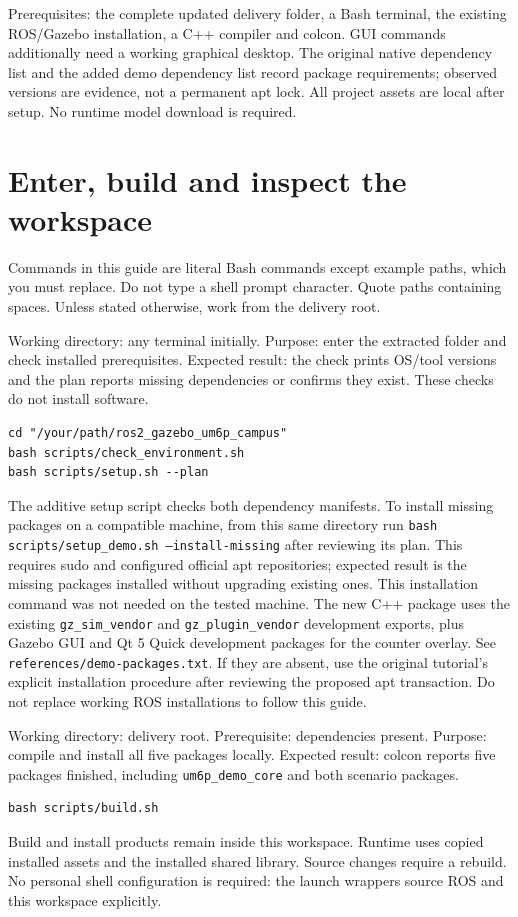 Prerequisites: the complete updated delivery folder, a Bash terminal, the existing ROS/Gazebo installation, a C++ compiler and colcon. GUI commands additionally need a working graphical desktop. The original native dependency list and the added demo dependency list record package requirements; observed versions are evidence, not a permanent apt lock. All project assets are local after setup. No runtime model download is required.

\section{Enter, build and inspect the workspace}
Commands in this guide are literal Bash commands except example paths, which you must replace. Do not type a shell prompt character. Quote paths containing spaces. Unless stated otherwise, work from the delivery root.

Working directory: any terminal initially. Purpose: enter the extracted folder and check installed prerequisites. Expected result: the check prints OS/tool versions and the plan reports missing dependencies or confirms they exist. These checks do not install software.
\begin{lstlisting}
cd "/your/path/ros2_gazebo_um6p_campus"
bash scripts/check_environment.sh
bash scripts/setup.sh --plan
\end{lstlisting}
The additive setup script checks both dependency manifests. To install missing packages on a compatible machine, from this same directory run \texttt{bash scripts/setup\_demo.sh --install-missing} after reviewing its plan. This requires sudo and configured official apt repositories; expected result is the missing packages installed without upgrading existing ones. This installation command was not needed on the tested machine. The new C++ package uses the existing \texttt{gz\_sim\_vendor} and \texttt{gz\_plugin\_vendor} development exports, plus Gazebo GUI and Qt 5 Quick development packages for the counter overlay. See \texttt{references/demo-packages.txt}. If they are absent, use the original tutorial's explicit installation procedure after reviewing the proposed apt transaction. Do not replace working ROS installations to follow this guide.

Working directory: delivery root. Prerequisite: dependencies present. Purpose: compile and install all five packages locally. Expected result: colcon reports five packages finished, including \texttt{um6p\_demo\_core} and both scenario packages.
\begin{lstlisting}
bash scripts/build.sh
\end{lstlisting}
Build and install products remain inside this workspace. Runtime uses copied installed assets and the installed shared library. Source changes require a rebuild. No personal shell configuration is required: the launch wrappers source ROS and this workspace explicitly.

